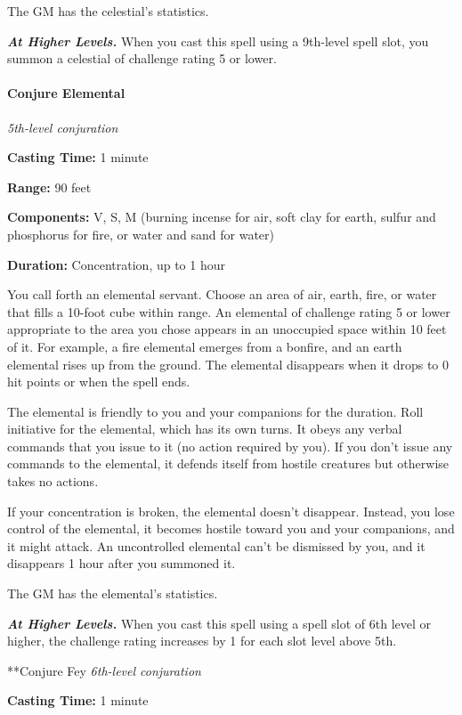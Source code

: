 \documentclass[
]{article}
\begin{document}
The GM has the celestial's statistics.

\emph{\textbf{At Higher Levels.}} When you cast this spell using a
9th-level spell slot, you summon a celestial of challenge rating 5 or
lower.

\hypertarget{conjure-elemental}{%
\paragraph{Conjure Elemental}\label{conjure-elemental}}

\emph{5th-level conjuration}

\textbf{Casting Time:} 1 minute

\textbf{Range:} 90 feet

\textbf{Components:} V, S, M (burning incense for air, soft clay for
earth, sulfur and phosphorus for fire, or water and sand for water)

\textbf{Duration:} Concentration, up to 1 hour

You call forth an elemental servant. Choose an area of air, earth, fire,
or water that fills a 10-foot cube within range. An elemental of
challenge rating 5 or lower appropriate to the area you chose appears in
an unoccupied space within 10 feet of it. For example, a fire elemental
emerges from a bonfire, and an earth elemental rises up from the ground.
The elemental disappears when it drops to 0 hit points or when the spell
ends.

The elemental is friendly to you and your companions for the duration.
Roll initiative for the elemental, which has its own turns. It obeys any
verbal commands that you issue to it (no action required by you). If you
don't issue any commands to the elemental, it defends itself from
hostile creatures but otherwise takes no actions.

If your concentration is broken, the elemental doesn't disappear.
Instead, you lose control of the elemental, it becomes hostile toward
you and your companions, and it might attack. An uncontrolled elemental
can't be dismissed by you, and it disappears 1 hour after you summoned
it.

The GM has the elemental's statistics.

\emph{\textbf{At Higher Levels.}} When you cast this spell using a spell
slot of 6th level or higher, the challenge rating increases by 1 for
each slot level above 5th.

**Conjure Fey \emph{6th-level conjuration}

\textbf{Casting Time:} 1 minute
\end{document}

